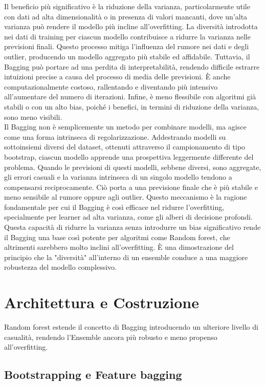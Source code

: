 \documentclass[a4paper,12pt]{report}
\begin{document}
	Il beneficio più significativo è la riduzione della varianza, particolarmente utile con dati ad alta dimensionalità o in presenza di valori mancanti, dove un'alta varianza può rendere il modello più incline all'overfitting. La diversità introdotta nei dati di training per ciascun modello contribuisce a ridurre la varianza nelle previsioni finali. Questo processo mitiga l'influenza del rumore nei dati e degli outlier, producendo un modello aggregato più stabile ed affidabile. Tuttavia, il Bagging può portare ad una perdita di interpretabilità, rendendo difficile estrarre intuizioni precise a causa del processo di media delle previsioni. È anche computazionalmente costoso, rallentando e diventando più intensivo all'aumentare del numero di iterazioni. Infine, è meno flessibile con algoritmi già stabili o con un alto bias, poiché i benefici, in termini di riduzione della varianza, sono meno visibili. \\
	Il Bagging non è semplicemente un metodo per combinare modelli, ma agisce come una forma intrinseca di regolarizzazione. Addestrando modelli su sottoinsiemi diversi del dataset, ottenuti attraverso il campionamento di tipo bootstrap, ciascun modello apprende una prospettiva leggermente differente del problema. Quando le previsioni di questi modelli, sebbene diversi, sono aggregate, gli errori casuali e la varianza intrinseca di un singolo modello tendono a compensarsi reciprocamente. Ciò porta a una previsione finale che è più stabile e meno sensibile al rumore oppure agli outlier. Questo meccanismo è la ragione fondamentale per cui il Bagging è così efficace nel ridurre l'overfitting, specialmente per learner ad alta varianza, come gli alberi di decisione profondi. Questa capacità di ridurre la varianza senza introdurre un bias significativo rende il Bagging una base così potente per algoritmi come Random forest, che altrimenti sarebbero molto inclini all'overfitting. È una dimostrazione del principio che la "diversità" all'interno di un ensemble conduce a una maggiore robustezza del modello complessivo.
	
	\section{Architettura e Costruzione}
	
	Random forest estende il concetto di Bagging introducendo un ulteriore livello di casualità, rendendo l'Ensemble ancora più robusto e meno propenso all'overfitting.
	
	\subsection{Bootstrapping e Feature bagging}
	
\end{document}

